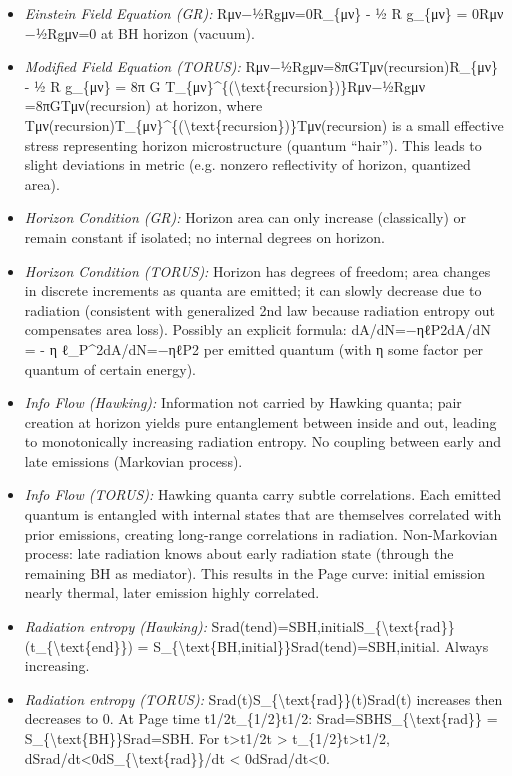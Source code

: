 \documentclass[]{article}
\begin{document}
\begin{itemize}
\item
  \emph{Einstein Field Equation (GR):} Rμν−½Rgμν=0R\_\{μν\} - ½ R
  g\_\{μν\} = 0Rμν​−½Rgμν​=0 at BH horizon (vacuum).
\item
  \emph{Modified Field Equation (TORUS):}
  Rμν−½Rgμν=8πGTμν(recursion)R\_\{μν\} - ½ R g\_\{μν\} = 8π G
  T\_\{μν\}\^{}\{(\textbackslash{}text\{recursion\})\}Rμν​−½Rgμν​=8πGTμν(recursion)​
  at horizon, where
  Tμν(recursion)T\_\{μν\}\^{}\{(\textbackslash{}text\{recursion\})\}Tμν(recursion)​
  is a small effective stress representing horizon microstructure
  (quantum ``hair''). This leads to slight deviations in metric (e.g.
  nonzero reflectivity of horizon, quantized area).
\item
  \emph{Horizon Condition (GR):} Horizon area can only increase
  (classically) or remain constant if isolated; no internal degrees on
  horizon.
\item
  \emph{Horizon Condition (TORUS):} Horizon has degrees of freedom; area
  changes in discrete increments as quanta are emitted; it can slowly
  decrease due to radiation (consistent with generalized 2nd law because
  radiation entropy out compensates area loss). Possibly an explicit
  formula: dA/dN=−ηℓP2dA/dN = - η ℓ\_P\^{}2dA/dN=−ηℓP2​ per emitted
  quantum (with η some factor per quantum of certain energy).
\item
  \emph{Info Flow (Hawking):} Information not carried by Hawking quanta;
  pair creation at horizon yields pure entanglement between inside and
  out, leading to monotonically increasing radiation entropy. No
  coupling between early and late emissions (Markovian process).
\item
  \emph{Info Flow (TORUS):} Hawking quanta carry subtle correlations.
  Each emitted quantum is entangled with internal states that are
  themselves correlated with prior emissions, creating long-range
  correlations in radiation. Non-Markovian process: late radiation knows
  about early radiation state (through the remaining BH as mediator).
  This results in the Page curve: initial emission nearly thermal, later
  emission highly correlated.
\item
  \emph{Radiation entropy (Hawking):}
  Srad(tend)=SBH,initialS\_\{\textbackslash{}text\{rad\}\}(t\_\{\textbackslash{}text\{end\}\})
  = S\_\{\textbackslash{}text\{BH,initial\}\}Srad​(tend​)=SBH,initial​.
  Always increasing.
\item
  \emph{Radiation entropy (TORUS):}
  Srad(t)S\_\{\textbackslash{}text\{rad\}\}(t)Srad​(t) increases then
  decreases to 0. At Page time t1/2t\_\{1/2\}t1/2​:
  Srad=SBHS\_\{\textbackslash{}text\{rad\}\} =
  S\_\{\textbackslash{}text\{BH\}\}Srad​=SBH​. For t\textgreater{}t1/2t
  \textgreater{} t\_\{1/2\}t\textgreater{}t1/2​,
  dSrad/dt\textless{}0dS\_\{\textbackslash{}text\{rad\}\}/dt \textless{}
  0dSrad​/dt\textless{}0.
\end{itemize}
\end{document}

